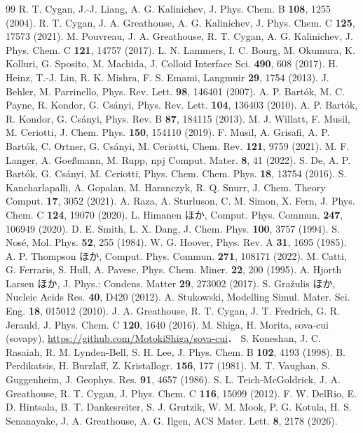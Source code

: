 \documentclass[a4paper,11pt]{article}
\begin{document}
\begin{thebibliography}{99}
 R. T. Cygan, J.-J. Liang, A. G. Kalinichev, J. Phys. Chem. B \textbf{108}, 1255 (2004).
 R. T. Cygan, J. A. Greathouse, A. G. Kalinichev, J. Phys. Chem. C \textbf{125}, 17573 (2021).
 M. Pouvreau, J. A. Greathouse, R. T. Cygan, A. G. Kalinichev, J. Phys. Chem. C \textbf{121}, 14757 (2017).
 L. N. Lammers, I. C. Bourg, M. Okumura, K. Kolluri, G. Sposito, M. Machida, J. Colloid Interface Sci. \textbf{490}, 608 (2017).
 H. Heinz, T.-J. Lin, R. K. Mishra, F. S. Emami, Langmuir \textbf{29}, 1754 (2013).
 J. Behler, M. Parrinello, Phys. Rev. Lett. \textbf{98}, 146401 (2007).
 A. P. Bart\'ok, M. C. Payne, R. Kondor, G. Cs\'anyi, Phys. Rev. Lett. \textbf{104}, 136403 (2010).
 A. P. Bart\'ok, R. Kondor, G. Cs\'anyi, Phys. Rev. B \textbf{87}, 184115 (2013).
 M. J. Willatt, F. Musil, M. Ceriotti, J. Chem. Phys. \textbf{150}, 154110 (2019).
 F. Musil, A. Grisafi, A. P. Bart\'ok, C. Ortner, G. Cs\'anyi, M. Ceriotti, Chem. Rev. \textbf{121}, 9759 (2021).
 M. F. Langer, A. Goe{\ss}mann, M. Rupp, npj Comput. Mater. \textbf{8}, 41 (2022).
 S. De, A. P. Bart\'ok, G. Cs\'anyi, M. Ceriotti, Phys. Chem. Chem. Phys. \textbf{18}, 13754 (2016).
 S. Kancharlapalli, A. Gopalan, M. Haranczyk, R. Q. Snurr, J. Chem. Theory Comput. \textbf{17}, 3052 (2021).
 A. Raza, A. Sturluson, C. M. Simon, X. Fern, J. Phys. Chem. C \textbf{124}, 19070 (2020).
 L. Himanen ほか, Comput. Phys. Commun. \textbf{247}, 106949 (2020).
 D. E. Smith, L. X. Dang, J. Chem. Phys. \textbf{100}, 3757 (1994).
 S. Nos\'e, Mol. Phys. \textbf{52}, 255 (1984).
 W. G. Hoover, Phys. Rev. A \textbf{31}, 1695 (1985).
 A. P. Thompson ほか, Comput. Phys. Commun. \textbf{271}, 108171 (2022).
 M. Catti, G. Ferraris, S. Hull, A. Pavese, Phys. Chem. Miner. \textbf{22}, 200 (1995).
 A. Hjorth Larsen ほか, J. Phys.: Condens. Matter \textbf{29}, 273002 (2017).
 S. Gra\v{z}ulis ほか, Nucleic Acids Res. \textbf{40}, D420 (2012).
 A. Stukowski, Modelling Simul. Mater. Sci. Eng. \textbf{18}, 015012 (2010).
 J. A. Greathouse, R. T. Cygan, J. T. Fredrich, G. R. Jerauld, J. Phys. Chem. C \textbf{120}, 1640 (2016).
 M. Shiga, H. Morita, sova-cui (sovapy), \url{https://github.com/MotokiShiga/sova-cui}．
 S. Koneshan, J. C. Rasaiah, R. M. Lynden-Bell, S. H. Lee, J. Phys. Chem. B \textbf{102}, 4193 (1998).
 B. Perdikatsis, H. Burzlaff, Z. Kristallogr. \textbf{156}, 177 (1981).
 M. T. Vaughan, S. Guggenheim, J. Geophys. Res. \textbf{91}, 4657 (1986).
 S. L. Teich-McGoldrick, J. A. Greathouse, R. T. Cygan, J. Phys. Chem. C \textbf{116}, 15099 (2012).
 F. W. DelRio, E. D. Hintsala, B. T. Dankesreiter, S. J. Grutzik, W. M. Mook, P. G. Kotula, H. S. Senanayake, J. A. Greathouse, A. G. Ilgen, ACS Mater. Lett. \textbf{8}, 2178 (2026).
\end{thebibliography}
\end{document}
